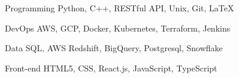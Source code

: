 

\begin{cvskills}

  \cvskill
    {Programming} %
    {Python, C++, RESTful API, Unix, Git, LaTeX} %

  \cvskill
    {DevOps} %
    {AWS, GCP, Docker, Kubernetes, Terraform, Jenkins} %

  \cvskill
    {Data} %
    {SQL, AWS Redshift, BigQuery, Postgresql, Snowflake} %

  \cvskill
    {Front-end} %
    {HTML5, CSS, React.js, JavaScript, TypeScript} %

\end{cvskills}
